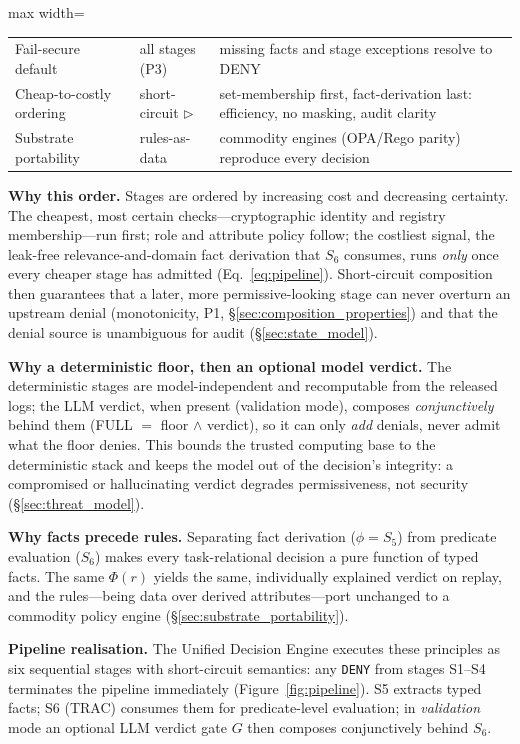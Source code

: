 \documentclass[sigconf,review,anonymous]{acmart}
\begin{document}
\begin{table}[!t]
\begin{adjustbox}{max width=\columnwidth}
\begin{tabular}{@{}lll@{}}
Fail-secure default & all stages (P3) & missing facts and stage exceptions resolve to DENY \\
Cheap-to-costly ordering & short-circuit $\rhd$ & set-membership first, fact-derivation last: efficiency, no masking, audit clarity \\
Substrate portability & rules-as-data & commodity engines (OPA/Rego parity) reproduce every decision \\
\bottomrule
\end{tabular}
\end{adjustbox}
\end{table}

\textbf{Why this order.} Stages are ordered by increasing cost and decreasing certainty. The cheapest, most certain checks---cryptographic identity and registry membership---run first; role and attribute policy follow; the costliest signal, the leak-free relevance-and-domain fact derivation that $S_6$ consumes, runs \emph{only} once every cheaper stage has admitted (Eq.~\ref{eq:pipeline}). Short-circuit composition then guarantees that a later, more permissive-looking stage can never overturn an upstream denial (monotonicity, P1, \S\ref{sec:composition_properties}) and that the denial source is unambiguous for audit (\S\ref{sec:state_model}).

\textbf{Why a deterministic floor, then an optional model verdict.} The deterministic stages are model-independent and recomputable from the released logs; the LLM verdict, when present (validation mode), composes \emph{conjunctively} behind them (FULL $=$ floor $\wedge$ verdict), so it can only \emph{add} denials, never admit what the floor denies. This bounds the trusted computing base to the deterministic stack and keeps the model out of the decision's integrity: a compromised or hallucinating verdict degrades permissiveness, not security (\S\ref{sec:threat_model}).

\textbf{Why facts precede rules.} Separating fact derivation ($\phi=S_5$) from predicate evaluation ($S_6$) makes every task-relational decision a pure function of typed facts. The same $\Phi(r)$ yields the same, individually explained verdict on replay, and the rules---being data over derived attributes---port unchanged to a commodity policy engine (\S\ref{sec:substrate_portability}).

\textbf{Pipeline realisation.} The Unified Decision Engine executes these principles as six sequential stages with short-circuit semantics: any \texttt{DENY} from stages S1--S4 terminates the pipeline immediately (Figure~\ref{fig:pipeline}). S5 extracts typed facts; S6 (TRAC) consumes them for predicate-level evaluation; in \emph{validation} mode an optional LLM verdict gate $G$ then composes conjunctively behind $S_6$.
\end{document}
